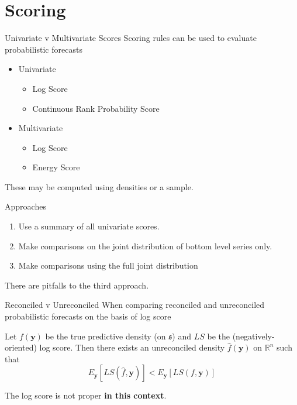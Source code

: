 \documentclass{beamer}
\begin{document}
  \section{Scoring}
  \begin{frame}{Univariate v Multivariate Scores}
    Scoring rules can be used to evaluate probabilistic forecasts
    \begin{itemize}
    	\item Univariate
    	\begin{itemize}
    		\item Log Score
    		\item Continuous Rank Probability Score
    	\end{itemize}
    	\item Multivariate
        \begin{itemize}
	      \item Log Score
	      \item Energy Score
        \end{itemize}
    \end{itemize}
    These may be computed using densities or a sample.
  \end{frame}
  \begin{frame}{Approaches}
  	\begin{enumerate}
  		\item Use a summary of all univariate scores.
  		\item Make comparisons on the joint distribution of bottom level series only.
        \item Make comparisons using the full joint distribution
  \end{enumerate}
  There are pitfalls to the third approach.
  \end{frame}
  \begin{frame}{Reconciled v Unreconciled}
	When comparing reconciled and unreconciled probabilistic forecasts on the basis of log score
	\begin{theorem}
		Let $f(\bm{y})$ be the true predictive density (on $\mathfrak{s}$) and $LS$ be the (negatively-oriented) log score.  Then there exists an unreconciled density  $\hat{f}(\bm{y})$ on $\mathbb{R}^n$ such that
		\begin{equation*}
		E_{\bm y}\left[LS(\hat{f},\bm{y})\right]<E_{\bm y}\left[LS(f,\bm{y})\right]
		\end{equation*}
	\end{theorem}
    The log score is not proper {\bf in this context}.
  \end{frame}
\end{document}
